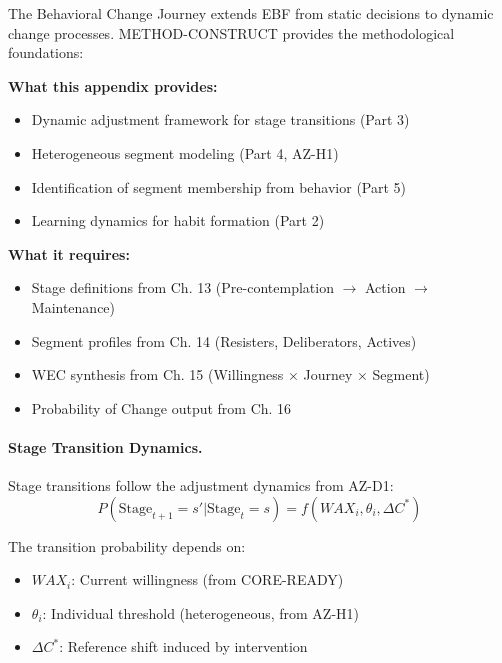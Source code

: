 The Behavioral Change Journey extends EBF from static decisions to dynamic
change processes. METHOD-CONSTRUCT provides the methodological foundations:

\begin{tcolorbox}[colback=yellow!5!white, colframe=yellow!75!black,
    title=Integration: METHOD-CONSTRUCT $\leftrightarrow$ Behavioral Change]
\textbf{What this appendix provides:}
\begin{itemize}[nosep]
\item Dynamic adjustment framework for stage transitions (Part 3)
\item Heterogeneous segment modeling (Part 4, AZ-H1)
\item Identification of segment membership from behavior (Part 5)
\item Learning dynamics for habit formation (Part 2)
\end{itemize}

\textbf{What it requires:}
\begin{itemize}[nosep]
\item Stage definitions from Ch. 13 (Pre-contemplation $\to$ Action $\to$ Maintenance)
\item Segment profiles from Ch. 14 (Resisters, Deliberators, Actives)
\item WEC synthesis from Ch. 15 (Willingness $\times$ Journey $\times$ Segment)
\item Probability of Change output from Ch. 16
\end{itemize}
\end{tcolorbox}

\paragraph{Stage Transition Dynamics.}
Stage transitions follow the adjustment dynamics from AZ-D1:
\begin{equation}
P(\text{Stage}_{t+1} = s' | \text{Stage}_t = s) = f(WAX_i, \theta_i, \Delta C^*)
\end{equation}

The transition probability depends on:
\begin{itemize}[nosep]
\item $WAX_i$: Current willingness (from CORE-READY)
\item $\theta_i$: Individual threshold (heterogeneous, from AZ-H1)
\item $\Delta C^*$: Reference shift induced by intervention
\end{itemize}

